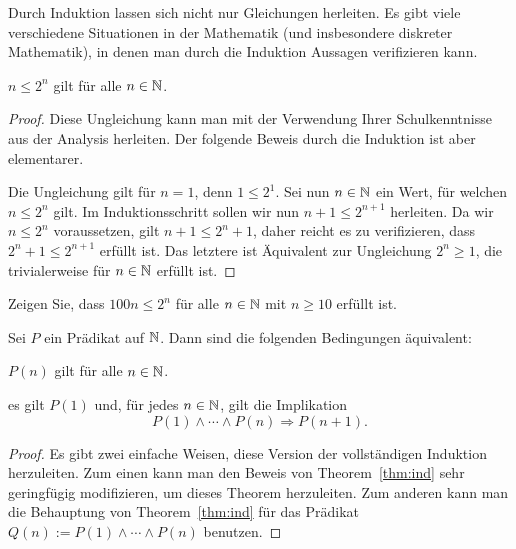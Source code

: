 \begin{bem}
	Durch Induktion lassen sich nicht nur Gleichungen herleiten. Es gibt viele verschiedene Situationen in der Mathematik (und insbesondere diskreter Mathematik), in denen man durch die Induktion Aussagen verifizieren kann. 
\end{bem} 

\begin{thm}
	$n \le 2^n$ gilt für alle $n \in \mathbb{N}$. 
\end{thm} 
\begin{proof} 
	Diese Ungleichung kann man mit der Verwendung Ihrer Schulkenntnisse aus der Analysis herleiten. Der folgende Beweis durch die Induktion ist aber elementarer. 
	
	Die Ungleichung gilt für $n=1$, denn $1 \le 2^1$. Sei nun $n \in \mathbb{N}$ ein Wert, für welchen $n \le 2^n$ gilt. Im Induktionsschritt sollen wir nun $n + 1 \le 2^{n+1}$ herleiten. Da wir $n \le 2^n$ voraussetzen, gilt $n+1 \le 2^n + 1$, daher reicht es zu verifizieren, dass $2^n + 1 \le 2^{n+1}$ erfüllt ist. Das letztere ist Äquivalent zur Ungleichung $2^n \ge 1$, die trivialerweise für $n \in \mathbb{N}$ erfüllt ist. 
\end{proof} 

\begin{aufg} 
	Zeigen Sie, dass $100 n \le 2^n$ für alle $n \in \mathbb{N}$ mit $n \ge 10$ erfüllt ist. 
\end{aufg} 


\begin{thm}
	\label{thm:ind:ver2}
	Sei $P$ ein Prädikat auf  $\mathbb{N}$. Dann sind die folgenden Bedingungen äquivalent: 
	\begin{enuma}
			\item $P(n)$ gilt für alle $n \in \mathbb{N}$. 
			\item es gilt $P(1)$ und, für jedes $n \in \mathbb{N}$, gilt die Implikation 
			\[
				P(1) \wedge \cdots \wedge P(n)  \Rightarrow P(n+1).
			\] 
	\end{enuma} 
\end{thm} 
\begin{proof} 
	Es gibt zwei einfache Weisen, diese Version der vollständigen Induktion herzuleiten. Zum einen kann man den Beweis von Theorem~\ref{thm:ind} sehr geringfügig modifizieren, um dieses Theorem herzuleiten. Zum anderen kann man die Behauptung von Theorem~\ref{thm:ind} für das Prädikat $Q(n) := P(1) \wedge \cdots \wedge P(n)$ benutzen. 
\end{proof} 

